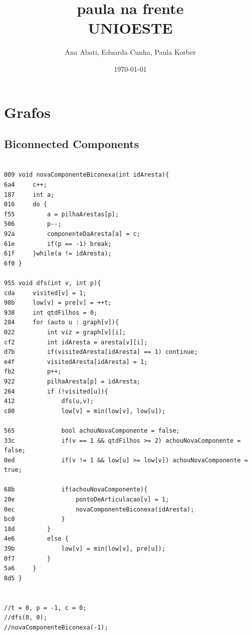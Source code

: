 \documentclass[11pt, a4paper, twoside]{article}
\title{paula na frente \\ UNIOESTE}
\author{Ana Abati, Eduarda Cunha, Paula Korber}
\begin{document}
\twocolumn
\date{\today}
\maketitle


\renewcommand{\contentsname}{Índice} %
\tableofcontents


%
%

\section{Grafos}

\subsection{Biconnected Components}
\begin{lstlisting}

009 void novaComponenteBiconexa(int idAresta){
6a4     c++;
187     int a;
016     do {
f55         a = pilhaArestas[p];
506         p--;
92a         componenteDaAresta[a] = c;
61e         if(p == -1) break;
61f     }while(a != idAresta);
6f0 }

955 void dfs(int v, int p){
cda     visited[v] = 1;
98b     low[v] = pre[v] = ++t;
938     int qtdFilhos = 0;
284     for (auto u : graph[v]){
022         int viz = graph[v][i];
cf2         int idAresta = aresta[v][i];
d7b         if(visitedAresta[idAresta] == 1) continue;
e4f         visitedAresta[idAresta] = 1;
fb2         p++;
922         pilhaAresta[p] = idAresta;
264         if (!visited[u]){
412             dfs(u,v);
c80             low[v] = min(low[v], low[u]);
    
565             bool achouNovaComponente = false;
33c             if(v == 1 && qtdFilhos >= 2) achouNovaComponente = false;
0ed             if(v != 1 && low[u] >= low[v]) achouNovaComponente = true;
    
68b             if(achouNovaComponente){
20e                 pontoDeArticulacao[v] = 1;
0ec                 novaComponenteBiconexa(idAresta);
bc0             }
18d         }   
4e6         else {
39b             low[v] = min(low[v], pre[u]);
0f7         }
5a6     }
8d5 }


//t = 0, p = -1, c = 0;
//dfs(0, 0);
//novaComponenteBiconexa(-1);
\end{lstlisting}
\end{document}
